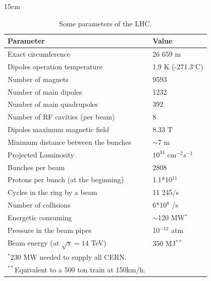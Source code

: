 \begin{table}[htbp]{15cm}
\caption{Some parameters of the LHC.}
\begin{tabular}{p{10cm}p{4cm}}
\hline \hline
Parameter									&	Value					    \\
\hline
Exact circumference						    &	26 659 m					\\
Dipoles operation temperature 			    &	1.9 K (-271.3$^{\circ}$C)	\\
Number of magnets                           &	9593						\\
Number of main dipoles          			&	1232						\\
Number of main quadrupoles                  &	392							\\
Number of RF cavities (per beam)			&	8        					\\
Dipoles maximum magnetic field  			&	8.33 T						\\
Minimum distance between the bunches 		&	$\sim$7 m					\\
Projected Luminosity 						&	$10^{34}$ cm$^{-2}s^{-1}$	\\
Bunches per beam 					        &	2808						\\
Protons per bunch (at the beginning)        &	1.1*10$^{11}$				\\
Cycles in the ring by a beam    			&	11 245/s					\\
Number of collisions						&	6*10$^{8}$ /s		        \\
Energetic consuming						    &	$\sim$120 MW$^{*}$			\\
Pressure in the beam pipes          		&	10$^{-13}$ atm				\\
Beam energy        (at $\sqrt{s} = 14$ TeV)	&	350 MJ$^{**}$				\\
\hline
$^{*}$230 MW needed to supply all CERN.		&								\\
$^{**}$Equivalent to a 500 ton train at 150km/h. &					        \\
\hline
\end{tabular}
\label{tab:lhc_parameters}
\end{table}

